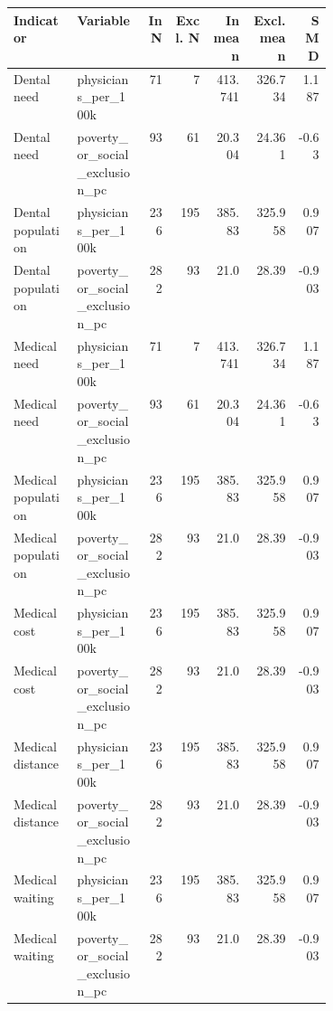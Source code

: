 \begin{tabular}{p{0.20\linewidth}p{0.21\linewidth}rrrrr}
\toprule
Indicator & Variable & In N & Excl. N & In mean & Excl. mean & SMD \\
\midrule
Dental need & physicians\_per\_100k & 71 & 7 & 413.741 & 326.734 & 1.187 \\
Dental need & poverty\_or\_social\_exclusion\_pc & 93 & 61 & 20.304 & 24.361 & -0.63 \\
Dental population & physicians\_per\_100k & 236 & 195 & 385.83 & 325.958 & 0.907 \\
Dental population & poverty\_or\_social\_exclusion\_pc & 282 & 93 & 21.0 & 28.39 & -0.903 \\
Medical need & physicians\_per\_100k & 71 & 7 & 413.741 & 326.734 & 1.187 \\
Medical need & poverty\_or\_social\_exclusion\_pc & 93 & 61 & 20.304 & 24.361 & -0.63 \\
Medical population & physicians\_per\_100k & 236 & 195 & 385.83 & 325.958 & 0.907 \\
Medical population & poverty\_or\_social\_exclusion\_pc & 282 & 93 & 21.0 & 28.39 & -0.903 \\
Medical cost & physicians\_per\_100k & 236 & 195 & 385.83 & 325.958 & 0.907 \\
Medical cost & poverty\_or\_social\_exclusion\_pc & 282 & 93 & 21.0 & 28.39 & -0.903 \\
Medical distance & physicians\_per\_100k & 236 & 195 & 385.83 & 325.958 & 0.907 \\
Medical distance & poverty\_or\_social\_exclusion\_pc & 282 & 93 & 21.0 & 28.39 & -0.903 \\
Medical waiting & physicians\_per\_100k & 236 & 195 & 385.83 & 325.958 & 0.907 \\
Medical waiting & poverty\_or\_social\_exclusion\_pc & 282 & 93 & 21.0 & 28.39 & -0.903 \\
\bottomrule
\end{tabular}
